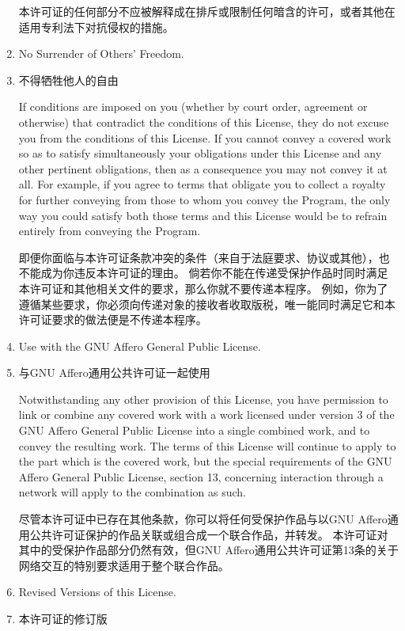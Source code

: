 \documentclass[11pt]{article}
\begin{document}
\begin{enumerate}
        本许可证的任何部分不应被解释成在排斥或限制任何暗含的许可，或者其他在适用专利法下对抗侵权的措施。

  \item No Surrender of Others' Freedom.
  \item 不得牺牲他人的自由

        If conditions are imposed on you (whether by court order, agreement or
        otherwise) that contradict the conditions of this License, they do not
        excuse you from the conditions of this License.  If you cannot convey a
        covered work so as to satisfy simultaneously your obligations under this
        License and any other pertinent obligations, then as a consequence you may
        not convey it at all.  For example, if you agree to terms that obligate you
        to collect a royalty for further conveying from those to whom you convey
        the Program, the only way you could satisfy both those terms and this
        License would be to refrain entirely from conveying the Program.

        即便你面临与本许可证条款冲突的条件（来自于法庭要求、协议或其他），也不能成为你违反本许可证的理由。
        倘若你不能在传递受保护作品时同时满足本许可证和其他相关文件的要求，那么你就不要传递本程序。
        例如，你为了遵循某些要求，你必须向传递对象的接收者收取版税，唯一能同时满足它和本许可证要求的做法便是不传递本程序。

  \item Use with the GNU Affero General Public License.
  \item 与GNU Affero通用公共许可证一起使用

        Notwithstanding any other provision of this License, you have
        permission to link or combine any covered work with a work licensed
        under version 3 of the GNU Affero General Public License into a single
        combined work, and to convey the resulting work.  The terms of this
        License will continue to apply to the part which is the covered work,
        but the special requirements of the GNU Affero General Public License,
        section 13, concerning interaction through a network will apply to the
        combination as such.

        尽管本许可证中已存在其他条款，你可以将任何受保护作品与以GNU Affero通用公共许可证保护的作品关联或组合成一个联合作品，并转发。
        本许可证对其中的受保护作品部分仍然有效，但GNU Affero通用公共许可证第13条的关于网络交互的特别要求适用于整个联合作品。

  \item Revised Versions of this License.
  \item 本许可证的修订版


\end{enumerate}
\end{document}
